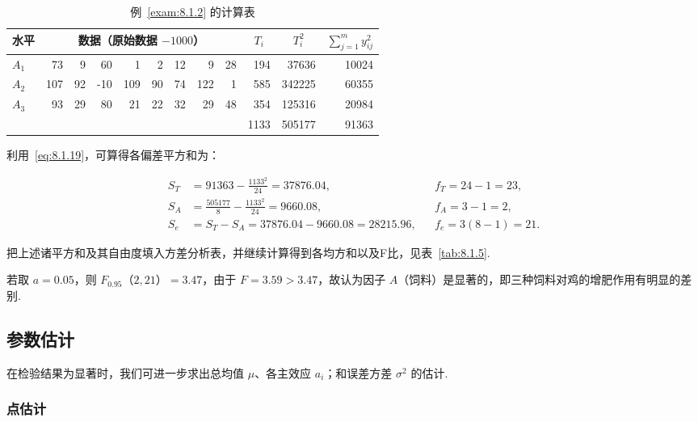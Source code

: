 \begin{table}[htbp]
  \centering
  \caption{例~\ref{exam:8.1.2} 的计算表}
    \begin{tabular}{rrrrrrrrrrrr}
    \toprule
    \multicolumn{1}{l}{水平} & \multicolumn{8}{c}{数据（原始数据 $-1000$）}                             & \multicolumn{1}{c}{$T_i$} & \multicolumn{1}{c}{$T_i^2$} & \multicolumn{1}{c}{$\sum_{j=1}^{m} y_{ij}^2$} \\
    \midrule
    \multicolumn{1}{l}{$A_1$} & 73    & 9     & 60    & 1     & 2     & 12    & 9     & 28    & 194   & 37636 & 10024 \\
    \multicolumn{1}{l}{$A_2$} & 107   & 92    & -10   & 109   & 90    & 74    & 122   & 1     & 585   & 342225 & 60355 \\
    \multicolumn{1}{l}{$A_3$} & 93    & 29    & 80    & 21    & 22    & 32    & 29    & 48    & 354   & 125316 & 20984 \\
    \midrule
          &       &       &       &       &       &       &       &       & 1133  & 505177 & 91363 \\
    \bottomrule
    \end{tabular}%
  \label{tab:8.1.4}%
\end{table}%

利用~\eqref{eq:8.1.19}，可算得各偏差平方和为：

\begin{align*}
S_T & = 91363 - \frac{1133^2}{24} = 37876.04, && f_T = 24-1=23,\\
S_A &= \frac{505177}{8} - \frac{1133^2}{24} = 9660.08, && f_A = 3 - 1 = 2,\\
S_e &= S_{T} - S_A = 37876.04 - 9660.08 = 28215.96, && f_{e} = 3(8-1)=21.
\end{align*}

把上述诸平方和及其自由度填入方差分析表，并继续计算得到各均方和以及F比，见表~\ref{tab:8.1.5}.
 

若取 $a=0.05$，则 $F_{0.95}（2, 21）=3.47$，由于 $F=3.59>3.47$，故认为因子 $A$（饲料）是显著的，即三种饲料对鸡的增肥作用有明显的差别.

\subsection{参数估计}

在检验结果为显著时，我们可进一步求出总均值 $\mu$、各主效应 $a_i$；和误差方差 $\sigma^2$ 的估计.

\subsubsection{点估计}

